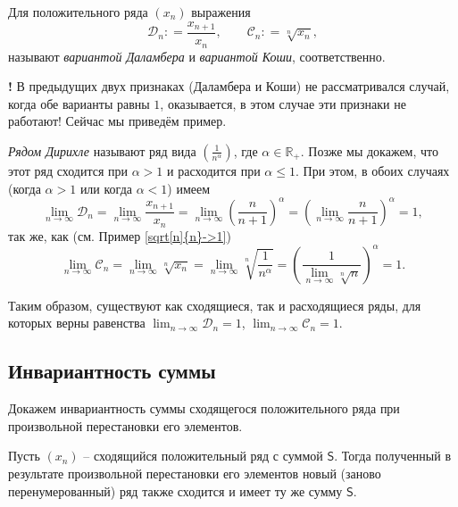 \begin{remark}
    Для положительного ряда $(x_n)$ выражения 
    \[
     \mathscr{D}_n: = \frac{x_{n+1}}{x_n}, \qquad \mathscr{C}_n: = \sqrt[n]{x_n},
    \]
    называют \textit{вариантой Даламбера} и \textit{вариантой Коши}, соответственно.
\end{remark}

\begin{mydanger}{\bf{!}}
 В предыдущих двух признаках (Даламбера и Коши) не рассматривался случай, когда обе варианты равны $1$, оказывается, в этом случае эти признаки не работают! Сейчас мы приведём пример.
\end{mydanger}

\begin{example}
    \textit{Рядом Дирихле} называют ряд вида $\left( \frac{1}{n^\alpha} \right)$, где $\alpha \in \mathbb{R}_+$. Позже мы докажем, что этот ряд сходится при $\alpha >1$ и расходится при $\alpha \le 1$. При этом, в обоих случаях (когда $\alpha >1$ или когда $\alpha <1$) имеем
    \[
     \lim_{n\to \infty} \mathscr{D}_n = \lim_{n \to \infty} \frac{x_{n+1}}{x_n} = \lim_{n\to \infty} \left(\frac{n}{n+1} \right)^\alpha  = \left( \lim_{n \to \infty} \frac{n}{n+1} \right)^\alpha =1,
    \]
    так же, как (см. Пример \ref{sqrt[n]{n}->1})
    \[
    \lim_{n\to \infty} \mathscr{C}_n =  \lim_{n\to \infty} \sqrt[n]{x_n} = \lim_{n \to \infty}\sqrt[n]{\frac{1}{n^\alpha}} = \left( \frac{1}{\lim\limits_{n\to \infty}\sqrt[n]{n}}\right)^\alpha =1.
    \]

    Таким образом, существуют как сходящиеся, так и расходящиеся ряды, для которых верны равенства $\lim_{n\to \infty}\mathscr{D}_n= 1$, $\lim_{n \to \infty}\mathscr{C}_n = 1.$
\end{example}

\subsection{Инвариантность суммы}

Докажем инвариантность суммы сходящегося положительного ряда при произвольной перестановки его элементов.

\begin{theorem}[ ]\label{comm_for_positive_series}
    Пусть $(x_n)$ -- сходящийся положительный ряд с суммой $\mathsf{S}$. Тогда полученный в результате произвольной перестановки его элементов новый (заново перенумерованный) ряд также сходится и имеет ту же сумму $\mathsf{S}.$
\end{theorem}

